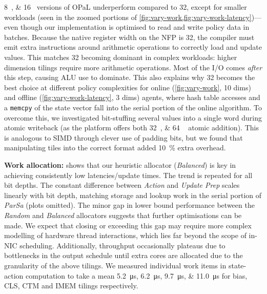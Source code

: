 \documentclass[
conference
,10pt
]{IEEEtran}
\newcommand{\fakepara}[1]{\noindent\textbf{#1:}}
\newcommand{\approachshort}{OPaL}
\begin{document}
\SIlist{8;16}{\bit} versions of \approachshort{} underperform compared to \SI{32}{\bit}, except for smaller workloads (seen in the zoomed portions of \cref{fig:vary-work,fig:vary-work-latency})---even though our implementation is optimised to read and write policy data in batches.
Because the native register width on the NFP is \SI{32}{\bit}, the compiler must emit extra instructions around arithmetic operations to correctly load and update values.
This matches \SI{32}{\bit} becoming dominant in complex workloads: higher dimension tilings require more arithmetic operations.
Most of the I/O comes \emph{after} this step, causing ALU use to dominate.
This also explains why \SI{32}{\bit} becomes the best choice at different policy complexities for online (\cref{fig:vary-work}, 10 dims) and offline (\cref{fig:vary-work-latency}, 3 dims) agents, where hash table accesses and a \texttt{memcpy} of the state vector fall into the serial portion of the online algorithm.
To overcome this, we investigated bit-stuffing several values into a single word during atomic writeback (as the platform offers both \SIlist{32;64
}{\bit} atomic addition).
This is analogous to SIMD through clever use of padding bits, but we found that manipulating tiles into the correct format added \SI{10}{\percent} extra overhead.

\fakepara{Work allocation}
 shows that our heuristic allocator (\emph{Balanced}) is key in achieving consistently low latencies/update times.
The trend is repeated for all bit depths.
The constant difference between \emph{Action} and \emph{Update Prep} scales linearly with bit depth, matching storage and lookup work in the serial portion of \emph{ParSa} (plots omitted).
The minor gap in lower bound performance between the \emph{Random} and \emph{Balanced} allocators suggests that further optimisations can be made.
We expect that closing or exceeding this gap may require more complex modelling of hardware thread interactions, which lies far beyond the scope of in-NIC scheduling.
Additionally, throughput occasionally plateaus due to bottlenecks in the output schedule until extra cores are allocated due to the granularity of the above tilings.
We measured individual work items in state-action computation to take a mean \SIlist{5.2; 6.2; 9.7; 11.0}{\micro\second} for bias, CLS, CTM and IMEM tilings respectively.
\end{document}
